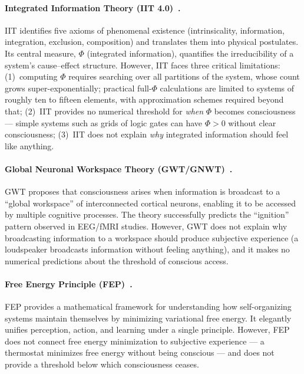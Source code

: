 \paragraph{Integrated Information Theory (IIT 4.0)~\cite{iit4}.}
IIT identifies five axioms of phenomenal existence (intrinsicality, information,
integration, exclusion, composition) and translates them into physical postulates.
Its central measure, $\Phi$ (integrated information), quantifies the irreducibility
of a system's cause--effect structure. However, IIT faces three critical
limitations: (1)~computing $\Phi$ requires searching over all partitions of the
system, whose count grows super-exponentially; practical full-$\Phi$ calculations
are limited to systems of roughly ten to fifteen elements, with approximation
schemes required beyond that; (2)~IIT provides no numerical threshold for
\emph{when} $\Phi$ becomes consciousness --- simple systems such as grids of
logic gates can have $\Phi > 0$ without clear consciousness; (3)~IIT does not
explain \emph{why} integrated information should feel like anything.

\paragraph{Global Neuronal Workspace Theory (GWT/GNWT)~\cite{dehaene2011}.}
GWT proposes that consciousness arises when information is broadcast to a ``global workspace''
of interconnected cortical neurons, enabling it to be accessed by multiple cognitive processes.
The theory successfully predicts the ``ignition'' pattern observed in EEG/fMRI studies.
However, GWT does not explain why broadcasting information to a workspace should produce
subjective experience (a loudspeaker broadcasts information without feeling anything), and
it makes no numerical predictions about the threshold of conscious access.

\paragraph{Free Energy Principle (FEP)~\cite{friston2019}.}
FEP provides a mathematical framework for understanding how self-organizing systems maintain
themselves by minimizing variational free energy. It elegantly unifies perception, action,
and learning under a single principle. However, FEP does not connect free energy minimization
to subjective experience --- a thermostat minimizes free energy without being conscious ---
and does not provide a threshold below which consciousness ceases.

